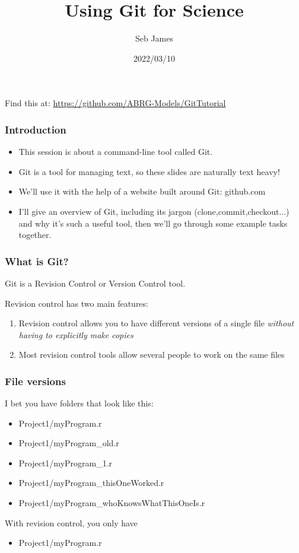 \documentclass{beamer}
\title{Using Git for Science}
\author{Seb James}
\institute{PSY6422}
\date{2022/03/10}
\begin{document}
\begin{frame}
  \titlepage %
  Find this at: \url{https://github.com/ABRG-Models/GitTutorial}
\end{frame}

\begin{frame}
  \frametitle{Introduction}
  \begin{itemize}
    \item This session is about a command-line tool called Git.

    \item Git is a tool for managing text, so these slides are naturally text
      heavy!

    \item We'll use it with the help of a website built around Git: github.com

    \item I'll give an overview of Git, including its jargon
      (\alert{clone},\alert{commit},\alert{checkout}...) and why it's
      such a useful tool, then we'll go through some example tasks together.
  \end{itemize}
\end{frame}

\begin{frame}
  \frametitle{What is Git?}
  Git is a \alert{Revision Control} or \alert{Version Control} tool.

  Revision control has two main features:

  \begin{enumerate}
    \pause \item Revision control allows you to have different versions of a
      single file \emph{without having to explicitly make copies}
      \pause \item Most revision control tools allow several people to work
      on the same files %
  \end{enumerate}
\end{frame}

\begin{frame}
  \frametitle{File versions}
  I bet you have folders that look like this:
  \pause \begin{itemize}
  \item Project1/myProgram.r
    \pause \item Project1/myProgram\_old.r
  \item Project1/myProgram\_1.r
  \item Project1/myProgram\_thisOneWorked.r
  \item Project1/myProgram\_whoKnowsWhatThisOneIs.r
  \end{itemize}
  \pause With revision control, you only have
  \begin{itemize}
  \item Project1/myProgram.r
  \end{itemize}
\end{frame}
\end{document}
